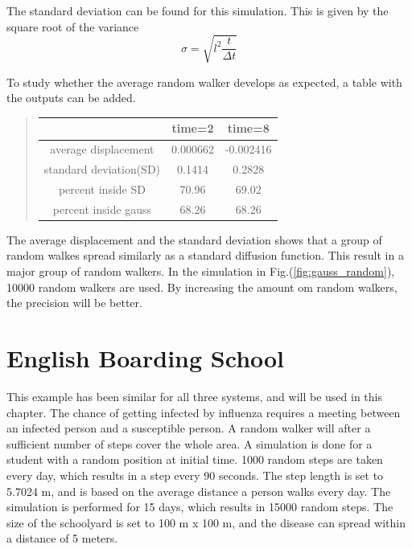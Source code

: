 \documentclass[%
twoside,                 %
final,                   %
chapterprefix=true,      %
open=right               %
10pt]{book}
\begin{document}
The standard deviation can be found for this simulation. This is given by the square root of the variance
\begin{equation}
\sigma = \sqrt{l^2\frac{t}{\Delta t}}
\end{equation}

To study whether the average random walker develops as expected, a table with the outputs can be added. 

\label{table:gauss_random}

\begin{quote}
\begin{tabular}{ccc}
\hline
\multicolumn{1}{c}{  } & \multicolumn{1}{c}{ time=2 } & \multicolumn{1}{c}{ time=8 } \\
\hline
average displacement   & 0.000662 & -0.002416 \\
standard deviation(SD) & 0.1414   & 0.2828    \\
percent inside SD      & 70.96    & 69.02     \\
percent inside gauss   & 68.26    & 68.26     \\
\hline
\end{tabular}
\end{quote}

\noindent
The average displacement and the standard deviation shows that a group of random walkes spread similarly as a standard diffusion function. This result in a major group of random walkers. In the simulation in Fig.(\ref{fig:gauss_random}), 10000 random walkers are used. By increasing the amount om random walkers, the precision will be better.

\section{English Boarding School}
This example has been similar for all three systems, and will be used in this chapter. The chance of getting infected by influenza requires a meeting between an infected person and a susceptible person. A random walker will after a sufficient number of steps cover the whole area. A simulation is done for a student with a random position at initial time. 1000 random steps are taken every day, which results in a step every 90 seconds. The step length is set to 5.7024 m, and is based on the average distance a person walks every day. The simulation is performed for 15 days, which results in 15000 random steps. The size of the schoolyard is set to 100 m x 100 m, and the disease can spread within a distance of 5 meters.
\end{document}
